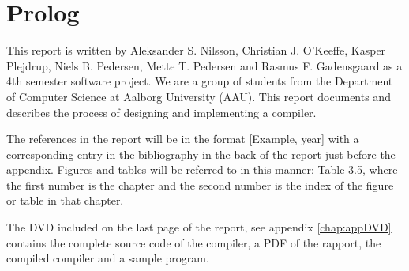 \chapter{Prolog}
This report is written by Aleksander S. Nilsson, Christian J. O'Keeffe, Kasper Plejdrup, Niels  B. Pedersen, Mette T. Pedersen and Rasmus F. Gadensgaard as a 4th semester software project. We are a group of students from the Department of Computer Science at Aalborg University (AAU). This report documents and describes the process of designing and implementing a compiler.

The references in the report will be in the format [Example, year] with a corresponding entry in the bibliography in the back of the report just before the appendix. Figures and tables will be referred to in this manner: Table 3.5, where the first number is the chapter and the second number is the index of the figure or table in that chapter.

The DVD included on the last page of the report, see appendix \ref{chap:appDVD} contains the complete source code of the compiler, a PDF of the rapport, the compiled compiler and a sample program.
